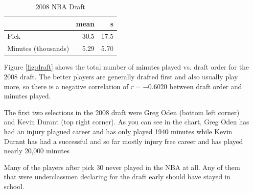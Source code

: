 \documentclass[letterpaper, landscape]{exam}
\begin{document}
\begin{questions}
        \begin{table}[H]
          \centering
          \begin{tabular}{lrr}
            \toprule
                                & mean & s \\
            \midrule
            Pick                & 30.5 & 17.5 \\
            Minutes (thousands) & 5.29 & 5.70 \\
            \bottomrule
          \end{tabular}
          \caption{2008 NBA Draft}
        \end{table}

        Figure \ref{fig:draft} shows the total number of minutes played vs.  draft
        order for the 2008 draft.  The better players are generally drafted first
        and also usually play more, so there is a negative correlation of 
        $r = -0.6020$ between draft order and minutes played.

        The first two selections in the 2008 draft were Greg Oden (bottom left
        corner) and Kevin Durant (top right corner).  As you can see in the
        chart, Greg Oden has had an injury plagued career and has only played
        1940 minutes while Kevin Durant has had a successful and so far mostly
        injury free career and has played nearly 20,000 minutes

        Many of the players after pick 30 never played in the NBA at all.  Any
        of them that were underclassmen declaring for the draft early should
        have stayed in school.

\end{questions}
\end{document}
